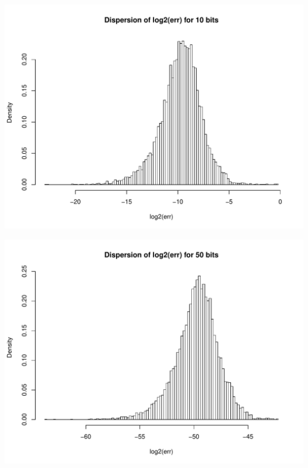 \documentclass[serif, 12pt]{beamer}
\begin{document}
\begin{frame}

\begin{adjustwidth}{-2em}{-2em}
\centering
\includegraphics[width=\linewidth]{../../src/err10.pdf}
\end{adjustwidth}

\end{frame}


\begin{frame}

\begin{adjustwidth}{-2em}{-2em}
\centering
\includegraphics[width=\linewidth]{../../src/err50.pdf}
\end{adjustwidth}

\end{frame}
\end{document}
